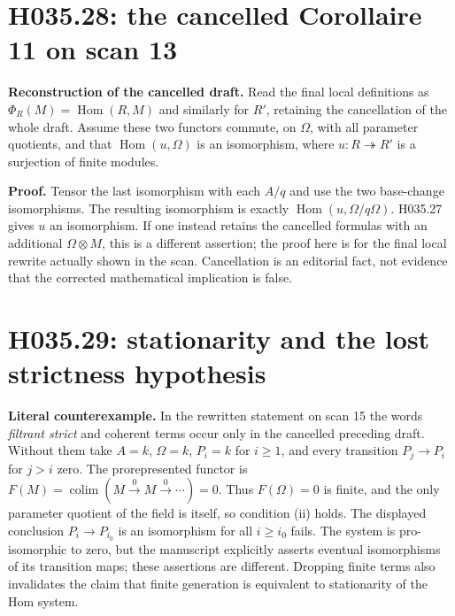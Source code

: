 \section{H035.28: the cancelled Corollaire 11 on scan 13}
\textbf{Reconstruction of the cancelled draft.} Read the final local
definitions as $\Phi_R(M)=\operatorname{Hom}(R,M)$ and similarly
for $R'$, retaining the cancellation of the whole draft. Assume these
two functors commute, on $\Omega$, with all parameter quotients, and
that $\operatorname{Hom}(u,\Omega)$ is an isomorphism, where
$u:R\twoheadrightarrow R'$ is a surjection of finite modules.

\textbf{Proof.} Tensor the last isomorphism with each $A/q$ and use
the two base-change isomorphisms. The resulting isomorphism is exactly
$\operatorname{Hom}(u,\Omega/q\Omega)$. H035.27 gives $u$ an
isomorphism. If one instead retains the cancelled formulas with an
additional $\Omega\otimes M$, this is a different assertion; the
proof here is for the final local rewrite actually shown in the scan.
Cancellation is an editorial fact, not evidence that the corrected
mathematical implication is false.

\section{H035.29: stationarity and the lost strictness hypothesis}
\textbf{Literal counterexample.} In the rewritten statement on scan
15 the words \emph{filtrant strict} and coherent terms occur only in
the cancelled preceding draft. Without them take $A=k$, $\Omega=k$,
$P_i=k$ for $i\geq1$, and every transition $P_j\to P_i$ for $j>i$
zero. The prorepresented functor is
$F(M)=\operatorname{colim}(M\xrightarrow0 M\xrightarrow0\cdots)=0$.
Thus $F(\Omega)=0$ is finite, and the only parameter quotient of the
field is itself, so condition (ii) holds. The displayed conclusion
$P_i\to P_{i_0}$ is an isomorphism for all $i\geq i_0$ fails.
The system is pro-isomorphic to zero, but the manuscript explicitly
asserts eventual isomorphisms of its transition maps; these assertions
are different. Dropping finite terms also invalidates the claim that
finite generation is equivalent to stationarity of the Hom system.

